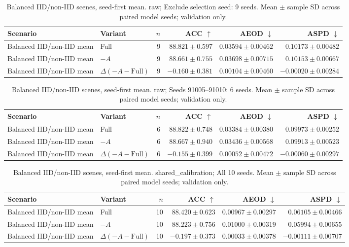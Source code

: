 \begin{table}[t]
\centering
\small
\caption{Balanced IID/non-IID scenes, seed-first mean. raw; Exclude selection seed: 9 seeds. Mean $\pm$ sample SD across paired model seeds; validation only.}
\begin{tabular}{llrrrr}
\toprule
Scenario & Variant & $n$ & ACC $\uparrow$ & AEOD $\downarrow$ & ASPD $\downarrow$ \\
\midrule
Balanced IID/non-IID mean & Full & 9 & $88.821 \pm 0.597$ & $0.03594 \pm 0.00462$ & $0.10173 \pm 0.00482$ \\
Balanced IID/non-IID mean & $-A$ & 9 & $88.661 \pm 0.755$ & $0.03698 \pm 0.00715$ & $0.10153 \pm 0.00667$ \\
Balanced IID/non-IID mean & $\Delta(-A-\mathrm{Full})$ & 9 & $-0.160 \pm 0.381$ & $0.00104 \pm 0.00460$ & $-0.00020 \pm 0.00284$ \\
\bottomrule
\end{tabular}
\end{table}

\begin{table}[t]
\centering
\small
\caption{Balanced IID/non-IID scenes, seed-first mean. raw; Seeds 91005–91010: 6 seeds. Mean $\pm$ sample SD across paired model seeds; validation only.}
\begin{tabular}{llrrrr}
\toprule
Scenario & Variant & $n$ & ACC $\uparrow$ & AEOD $\downarrow$ & ASPD $\downarrow$ \\
\midrule
Balanced IID/non-IID mean & Full & 6 & $88.822 \pm 0.748$ & $0.03384 \pm 0.00380$ & $0.09973 \pm 0.00252$ \\
Balanced IID/non-IID mean & $-A$ & 6 & $88.667 \pm 0.940$ & $0.03436 \pm 0.00568$ & $0.09913 \pm 0.00523$ \\
Balanced IID/non-IID mean & $\Delta(-A-\mathrm{Full})$ & 6 & $-0.155 \pm 0.399$ & $0.00052 \pm 0.00472$ & $-0.00060 \pm 0.00297$ \\
\bottomrule
\end{tabular}
\end{table}

\begin{table}[t]
\centering
\small
\caption{Balanced IID/non-IID scenes, seed-first mean. shared\_calibration; All 10 seeds. Mean $\pm$ sample SD across paired model seeds; validation only.}
\begin{tabular}{llrrrr}
\toprule
Scenario & Variant & $n$ & ACC $\uparrow$ & AEOD $\downarrow$ & ASPD $\downarrow$ \\
\midrule
Balanced IID/non-IID mean & Full & 10 & $88.420 \pm 0.623$ & $0.00967 \pm 0.00297$ & $0.06105 \pm 0.00466$ \\
Balanced IID/non-IID mean & $-A$ & 10 & $88.223 \pm 0.756$ & $0.01000 \pm 0.00319$ & $0.05994 \pm 0.00655$ \\
Balanced IID/non-IID mean & $\Delta(-A-\mathrm{Full})$ & 10 & $-0.197 \pm 0.373$ & $0.00033 \pm 0.00378$ & $-0.00111 \pm 0.00707$ \\
\bottomrule
\end{tabular}
\end{table}


